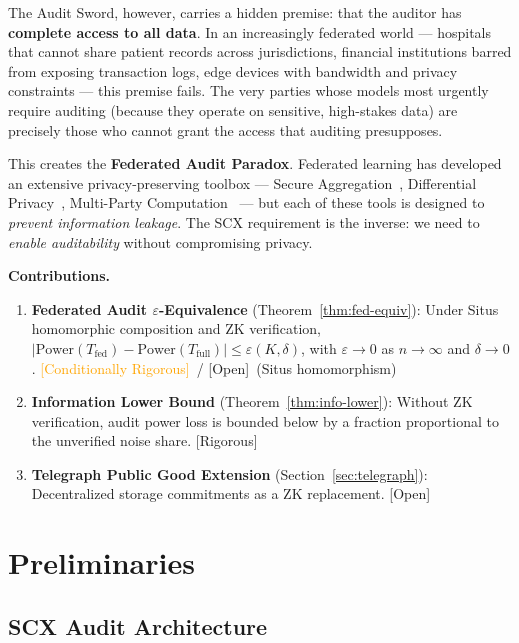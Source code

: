 \documentclass[12pt,a4paper]{article}
\newcommand{\rigorous}{\textcolor{green!50!black}{\small\textsf{[Rigorous]}}}
\newcommand{\conditionallyrigorous}{\textcolor{orange}{\small\textsf{[Conditionally Rigorous]}}}
\newcommand{\openquest}{\textcolor{red!70!black}{\small\textsf{[Open]}}}
\newcommand{\ZK}{\mathrm{ZK}}
\newcommand{\Power}{\mathrm{Power}}
\begin{document}
The Audit Sword, however, carries a hidden premise: that the auditor has
\textbf{complete access to all data}.  In an increasingly federated world ---
hospitals that cannot share patient records across jurisdictions, financial
institutions barred from exposing transaction logs, edge devices with
bandwidth and privacy constraints --- this premise fails.  The very parties
whose models most urgently require auditing (because they operate on
sensitive, high-stakes data) are precisely those who cannot grant the access
that auditing presupposes.

This creates the \textbf{Federated Audit Paradox}.  Federated learning has
developed an extensive privacy-preserving toolbox --- Secure
Aggregation~\citep{bonawitz2017practical}, Differential
Privacy~\citep{abadi2016deep}, Multi-Party
Computation~\citep{evans2018pragmatic} --- but each of these tools is designed
to \emph{prevent information leakage}.  The \textsf{SCX} requirement is the inverse:
we need to \emph{enable auditability} without compromising privacy.

\medskip\noindent
\textbf{Contributions.}
\begin{enumerate}[label=(\arabic*)]
    \item \textbf{Federated Audit $\varepsilon$-Equivalence}
          (Theorem~\ref{thm:fed-equiv}): Under Situs homomorphic composition
          and $\ZK$ verification, $|\Power(T_{\mathrm{fed}}) -
          \Power(T_{\mathrm{full}})| \leq \varepsilon(K, \delta)$,
          with $\varepsilon \to 0$ as $n \to \infty$ and $\delta \to 0$.
          \conditionallyrigorous~/ \openquest~(Situs homomorphism)
    \item \textbf{Information Lower Bound}
          (Theorem~\ref{thm:info-lower}): Without $\ZK$ verification, audit
          power loss is bounded below by a fraction proportional to the
          unverified noise share.  \rigorous
    \item \textbf{Telegraph Public Good Extension}
          (Section~\ref{sec:telegraph}): Decentralized storage commitments
          as a $\ZK$ replacement.  \openquest
\end{enumerate}

\section{Preliminaries}

\subsection{SCX Audit Architecture}
\end{document}
